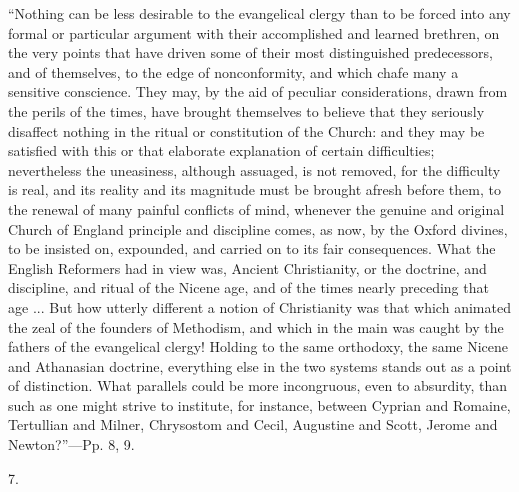 ``Nothing
can be less desirable to the evangelical clergy than to be forced into
any formal or particular argument with their accomplished and learned
brethren, on the very points that have driven some of their most
distinguished predecessors, and of themselves, to the edge of
nonconformity, and which chafe many a sensitive conscience.
They may, by the aid of peculiar considerations, drawn from the perils
of the times, have brought themselves to believe that they seriously
disaffect nothing in the ritual or constitution of the Church: and
they may be satisfied with this or that elaborate explanation of
certain difficulties; nevertheless the uneasiness, although assuaged,
is not removed, for the difficulty is real, and its reality and its
magnitude must be brought afresh before them, to the renewal of many
painful conflicts of mind, whenever the genuine and original Church of
England principle and discipline comes, as now, by the Oxford divines,
to be insisted on, expounded, and carried on to its fair consequences.
What the English Reformers had in view was, Ancient Christianity, or
the doctrine, and discipline, and ritual of the Nicene age, and of the
times nearly preceding that age ... But how utterly different a notion
of Christianity was that which animated the zeal of the founders of
Methodism, and which in the main was caught by the fathers of the
evangelical clergy! Holding to the same orthodoxy, the same Nicene and
Athanasian doctrine, everything else in the two systems stands out as
a point of distinction. What parallels could be more incongruous, even
to absurdity, than such as one might strive to institute, for
instance, between Cyprian and Romaine, Tertullian and Milner,
Chrysostom and Cecil, Augustine and Scott, Jerome and Newton?''—Pp.
8, 9.

7.

